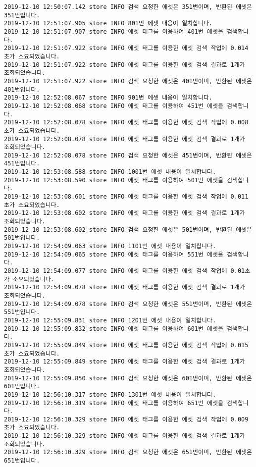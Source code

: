 \begin{Verbatim}[fontsize=\tiny, breaklines=true, breakanywhere=true]
2019-12-10 12:50:07.142 store INFO 검색 요청한 에셋은 351번이며, 반환된 에셋은 351번입니다.
2019-12-10 12:51:07.905 store INFO 801번 에셋 내용이 일치합니다.
2019-12-10 12:51:07.907 store INFO 에셋 태그를 이용하여 401번 에셋을 검색합니다.
2019-12-10 12:51:07.922 store INFO 에셋 태그를 이용한 에셋 검색 작업에 0.014초가 소요되었습니다.
2019-12-10 12:51:07.922 store INFO 에셋 태그를 이용한 에셋 검색 결과로 1개가 조회되었습니다.
2019-12-10 12:51:07.922 store INFO 검색 요청한 에셋은 401번이며, 반환된 에셋은 401번입니다.
2019-12-10 12:52:08.067 store INFO 901번 에셋 내용이 일치합니다.
2019-12-10 12:52:08.068 store INFO 에셋 태그를 이용하여 451번 에셋을 검색합니다.
2019-12-10 12:52:08.078 store INFO 에셋 태그를 이용한 에셋 검색 작업에 0.008초가 소요되었습니다.
2019-12-10 12:52:08.078 store INFO 에셋 태그를 이용한 에셋 검색 결과로 1개가 조회되었습니다.
2019-12-10 12:52:08.078 store INFO 검색 요청한 에셋은 451번이며, 반환된 에셋은 451번입니다.
2019-12-10 12:53:08.588 store INFO 1001번 에셋 내용이 일치합니다.
2019-12-10 12:53:08.590 store INFO 에셋 태그를 이용하여 501번 에셋을 검색합니다.
2019-12-10 12:53:08.601 store INFO 에셋 태그를 이용한 에셋 검색 작업에 0.011초가 소요되었습니다.
2019-12-10 12:53:08.602 store INFO 에셋 태그를 이용한 에셋 검색 결과로 1개가 조회되었습니다.
2019-12-10 12:53:08.602 store INFO 검색 요청한 에셋은 501번이며, 반환된 에셋은 501번입니다.
2019-12-10 12:54:09.063 store INFO 1101번 에셋 내용이 일치합니다.
2019-12-10 12:54:09.065 store INFO 에셋 태그를 이용하여 551번 에셋을 검색합니다.
2019-12-10 12:54:09.077 store INFO 에셋 태그를 이용한 에셋 검색 작업에 0.01초가 소요되었습니다.
2019-12-10 12:54:09.078 store INFO 에셋 태그를 이용한 에셋 검색 결과로 1개가 조회되었습니다.
2019-12-10 12:54:09.078 store INFO 검색 요청한 에셋은 551번이며, 반환된 에셋은 551번입니다.
2019-12-10 12:55:09.831 store INFO 1201번 에셋 내용이 일치합니다.
2019-12-10 12:55:09.832 store INFO 에셋 태그를 이용하여 601번 에셋을 검색합니다.
2019-12-10 12:55:09.849 store INFO 에셋 태그를 이용한 에셋 검색 작업에 0.015초가 소요되었습니다.
2019-12-10 12:55:09.849 store INFO 에셋 태그를 이용한 에셋 검색 결과로 1개가 조회되었습니다.
2019-12-10 12:55:09.850 store INFO 검색 요청한 에셋은 601번이며, 반환된 에셋은 601번입니다.
2019-12-10 12:56:10.317 store INFO 1301번 에셋 내용이 일치합니다.
2019-12-10 12:56:10.319 store INFO 에셋 태그를 이용하여 651번 에셋을 검색합니다.
2019-12-10 12:56:10.329 store INFO 에셋 태그를 이용한 에셋 검색 작업에 0.009초가 소요되었습니다.
2019-12-10 12:56:10.329 store INFO 에셋 태그를 이용한 에셋 검색 결과로 1개가 조회되었습니다.
2019-12-10 12:56:10.329 store INFO 검색 요청한 에셋은 651번이며, 반환된 에셋은 651번입니다.

\end{Verbatim}
